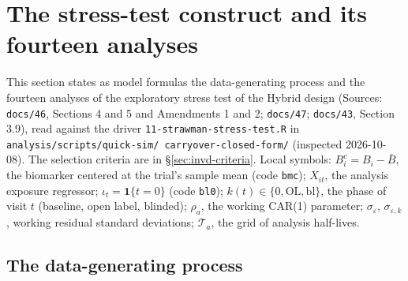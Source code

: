 \documentclass[11pt]{article}
\newcommand{\code}[1]{\texttt{#1}}
\begin{document}
\section{The stress-test construct and its fourteen analyses}
\label{sec:invd-stress}

This section states as model formulas the data-generating process and
the fourteen analyses of the exploratory stress test of the Hybrid
design (Sources: \code{docs/46}, Sections 4 and 5 and Amendments 1 and
2; \code{docs/47}; \code{docs/43}, Section 3.9), read against the
driver \code{11-strawman-\allowbreak stress-\allowbreak test.R} in
\code{analysis/\allowbreak scripts/\allowbreak quick-sim/\allowbreak
carryover-closed-form/} (inspected 2026-10-08). The selection criteria are in
\S\ref{sec:invd-criteria}. Local symbols: $B^{c}_i = B_i - \bar B$, the
biomarker centered at the trial's sample mean (code \code{bmc});
$X_{it}$, the analysis exposure regressor; $\iota_t = \mathbf 1\{t =
0\}$ (code \code{bl0}); $k(t) \in \{0, \mathrm{OL}, \mathrm{bl}\}$, the
phase of visit $t$ (baseline, open label, blinded); $\rho_a$, the
working CAR(1) parameter; $\sigma_\varepsilon$, $\sigma_{\varepsilon,k}$, working residual
standard deviations; $\mathcal T_a$, the grid of analysis half-lives.

\subsection{The data-generating process}
\label{sec:invd-dgp}
\end{document}
